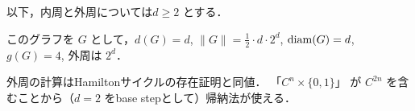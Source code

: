 \subsection{}
以下，内周と外周については$d\geq 2$ とする．

このグラフを $G$ として，$d(G) = d$, $\|G\| = \frac{1}{2}\cdot d\cdot 2^d$, $\operatorname{diam}(G) = d$, $g(G) = 4$, 外周は $2^d$．

外周の計算はHamiltonサイクルの存在証明と同値．
「$C^n \times \{0,1\}$」 が $C^{2n}$ を含むことから（$d=2$ をbase stepとして）帰納法が使える．

